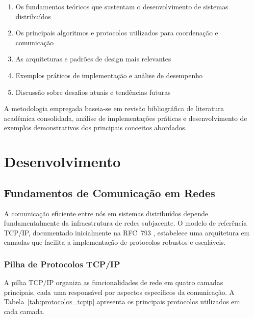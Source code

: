 \begin{enumerate}
    \item Os fundamentos teóricos que sustentam o desenvolvimento de sistemas distribuídos
    \item Os principais algoritmos e protocolos utilizados para coordenação e comunicação
    \item As arquiteturas e padrões de design mais relevantes
    \item Exemplos práticos de implementação e análise de desempenho
    \item Discussão sobre desafios atuais e tendências futuras
\end{enumerate}

A metodologia empregada baseia-se em revisão bibliográfica de literatura acadêmica consolidada, análise de implementações práticas e desenvolvimento de exemplos demonstrativos dos principais conceitos abordados.

\section{Desenvolvimento}

\subsection{Fundamentos de Comunicação em Redes}

A comunicação eficiente entre nós em sistemas distribuídos depende fundamentalmente da infraestrutura de redes subjacente. O modelo de referência TCP/IP, documentado inicialmente na RFC~793 \cite{rfc793:1981}, estabelece uma arquitetura em camadas que facilita a implementação de protocolos robustos e escaláveis.

\subsubsection{Pilha de Protocolos TCP/IP}

A pilha TCP/IP organiza as funcionalidades de rede em quatro camadas principais, cada uma responsável por aspectos específicos da comunicação. A Tabela~\ref{tab:protocolos_tcpip} apresenta os principais protocolos utilizados em cada camada.

